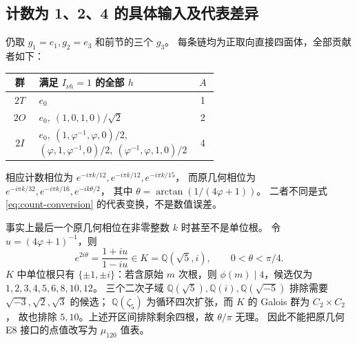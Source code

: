\subsection{计数为 1、2、4 的具体输入及代表差异}
仍取 $g_1=e_1,g_2=e_3$ 和前节的三个 $g_3$。
每条链均为正取向直接四面体，全部贡献者如下：
\begin{longtable}{@{}c p{0.60\linewidth} c@{}}
\toprule 群 & 满足 $I_{\nu h}=1$ 的全部 $h$ & $A$\\\midrule
$2T$ & $e_0$ & 1\\
$2O$ & $e_0,\ (1,0,1,0)/\sqrt2$ & 2\\
$2I$ & $e_0,\ (1,\varphi^{-1},\varphi,0)/2,$\newline
$(\varphi,1,\varphi^{-1},0)/2,\ (\varphi^{-1},\varphi,1,0)/2$ & 4\\
\bottomrule
\end{longtable}
相应计数相位为 $e^{-i\pi k/12},e^{-i\pi k/12},e^{-i\pi k/15}$，
而原几何相位为 $e^{-i\pi k/32},e^{-i\pi k/16},e^{-ik\theta/2}$，
其中 $\theta=\arctan(1/(4\varphi+1))$。
二者不同是式 \eqref{eq:count-conversion} 的代表变换，不是数值误差。

事实上最后一个原几何相位在非零整数 $k$ 时甚至不是单位根。
令 $u=(4\varphi+1)^{-1}$，则
\[
e^{2i\theta}=\frac{1+iu}{1-iu}\in K=\mathbb Q(\sqrt5,i),
\qquad 0<\theta<\pi/4.
\]
$K$ 中单位根只有 $\{\pm1,\pm i\}$：若含原始 $m$ 次根，则
$\phi(m)\mid4$，候选仅为 $1,2,3,4,5,6,8,10,12$。
三个二次子域 $\mathbb Q(\sqrt5),\mathbb Q(i),\mathbb Q(\sqrt{-5})$
排除需要 $\sqrt{-3},\sqrt2,\sqrt3$ 的候选；
$\mathbb Q(\zeta_5)$ 为循环四次扩张，而 $K$ 的 Galois 群为 $C_2\times C_2$，
故也排除 $5,10$。上述开区间排除剩余四根，故 $\theta/\pi$ 无理。
因此不能把原几何 E8 接口的点值改写为 $\mu_{120}$ 值表。

